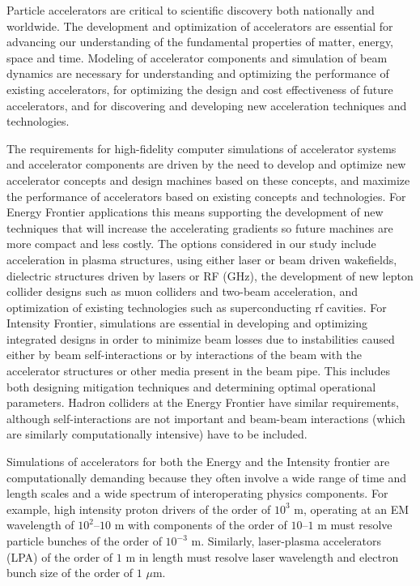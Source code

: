 Particle accelerators are critical to scientific discovery both nationally and worldwide. The development and optimization of accelerators are essential for advancing our understanding of the fundamental properties of matter, energy, space and time. Modeling of accelerator components and simulation of beam dynamics are necessary for understanding and optimizing the performance of existing accelerators, for optimizing the design and cost effectiveness of future accelerators, and for discovering and developing new acceleration techniques and technologies.

The requirements for high-fidelity computer simulations of accelerator systems and accelerator components are driven by the need to develop and optimize new accelerator concepts and design machines based on these concepts, and maximize the performance of accelerators based on existing concepts and technologies.  For  Energy Frontier applications this means supporting the development of new techniques that will increase the accelerating gradients so future machines are more compact and less costly. The options considered in our study include acceleration in plasma structures, using either laser or beam driven wakefields, dielectric structures driven by lasers or RF (GHz), the development of new lepton collider designs such as muon colliders and two-beam acceleration, and optimization of existing technologies such as superconducting rf cavities. For  Intensity Frontier, simulations are essential in developing and optimizing integrated designs in order to minimize beam losses due to instabilities caused either by beam self-interactions or by interactions of the beam with the accelerator structures or other media present in the beam pipe.  This  includes both designing mitigation techniques and determining optimal operational parameters.  Hadron colliders at the Energy Frontier have similar requirements, although self-interactions are not important and beam-beam interactions (which are similarly computationally intensive) have to be included.  

Simulations of accelerators for both the Energy and the Intensity frontier are computationally demanding because they often involve a wide range of time and length scales and a wide spectrum of interoperating physics components. For example, high intensity proton drivers of the order of $10^3$ m, operating at an EM wavelength of $10^2$--$10$ m with components of the order of $10$--$1$ m must resolve particle bunches of the order of $10^{-3}$ m. Similarly, laser-plasma accelerators (LPA) of the order of $1$ m in length must resolve laser wavelength and electron bunch size of the order of $1$ $\mu$m.


